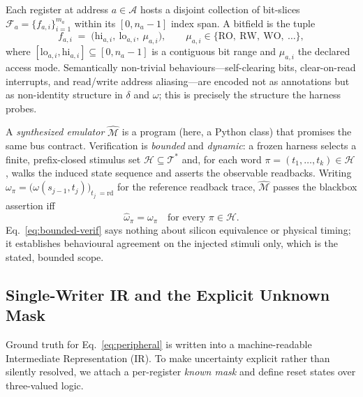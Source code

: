 \documentclass[preprint,review]{elsarticle}
\theoremstyle{definition}
\begin{document}
Each register at address $a \in \mathcal{A}$ hosts a disjoint collection of bit-slices
$\mathcal{F}_a=\{f_{a,i}\}_{i=1}^{m_a}$ within its $[0, n_a-1]$ index span. A bitfield is the tuple
\begin{equation}
f_{a,i} \;=\; \bigl(\mathrm{hi}_{a,i},\ \mathrm{lo}_{a,i},\ \mu_{a,i}\bigr),
\qquad \mu_{a,i}\in\{\mathrm{RO},\ \mathrm{RW},\ \mathrm{WO},\ \dots\},
\label{eq:field}
\end{equation}
where $[\mathrm{lo}_{a,i},\mathrm{hi}_{a,i}] \subseteq [0, n_a-1]$ is a contiguous bit range and $\mu_{a,i}$
the declared access mode. Semantically non-trivial behaviours---self-clearing bits,
clear-on-read interrupts, and read/write address aliasing---are encoded not as annotations
but as non-identity structure in $\delta$ and $\omega$; this is precisely the structure the
harness probes.

A \emph{synthesized emulator} $\hat{\mathcal{M}}$ is a program (here, a Python class) that
promises the same bus contract. Verification is \emph{bounded} and \emph{dynamic}: a frozen
harness selects a finite, prefix-closed stimulus set $\mathcal{H}\subseteq\mathcal{T}^{*}$
and, for each word $\pi=(t_1,\dots,t_k)\in\mathcal{H}$, walks the induced state sequence
and asserts the observable readbacks. Writing
$\omega_\pi=\bigl(\omega(s_{j-1},t_j)\bigr)_{t_j\;=\mathrm{rd}}$ for the reference
readback trace, $\hat{\mathcal{M}}$ passes the blackbox assertion iff
\begin{equation}
\hat\omega_\pi = \omega_\pi \quad \text{for every } \pi\in\mathcal{H}.
\label{eq:bounded-verif}
\end{equation}
Eq.~\eqref{eq:bounded-verif} says nothing about silicon equivalence or physical timing; it
establishes behavioural agreement on the injected stimuli only, which is the stated,
bounded scope.

\subsection{Single-Writer IR and the Explicit Unknown Mask}
\label{sec:ir-known-mask}

Ground truth for Eq.~\eqref{eq:peripheral} is written into a machine-readable Intermediate
Representation (IR). To make uncertainty explicit rather than silently resolved, we attach
a per-register \emph{known mask} and define reset states over three-valued logic.
\end{document}
